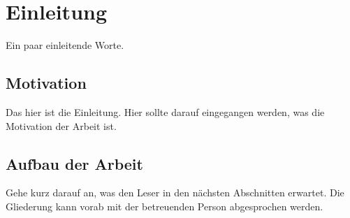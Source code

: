 \chapter{Einleitung}

Ein paar einleitende Worte.

\section{Motivation}

Das hier ist die Einleitung.
Hier sollte darauf eingegangen werden, was die Motivation der Arbeit ist.

\section{Aufbau der Arbeit}

Gehe kurz darauf an, was den Leser in den nächsten Abschnitten erwartet.
Die Gliederung kann vorab mit der betreuenden Person abgesprochen werden.
